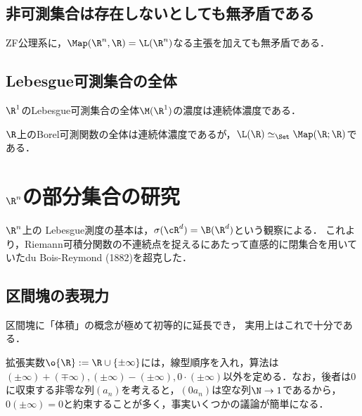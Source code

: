\documentclass[uplatex, dvipdfmx]{jsreport}
\begin{document}
\subsection{非可測集合は存在しないとしても無矛盾である}

\begin{theorem}[Solovay, R. (1970).]
    ZF公理系に，$\Map(\R^n,\R)=\L(\R^n)$なる主張を加えても無矛盾である．
\end{theorem}

\subsection{Lebesgue可測集合の全体}

\begin{corollary}
    $\R^1$のLebesgue可測集合の全体$\M(\R^1)$の濃度は連続体濃度である．
\end{corollary}

\begin{theorem}
    $\R$上のBorel可測関数の全体は連続体濃度であるが，$\L(\R)\simeq_\Set\Map(\R;\R)$である．
\end{theorem}

\section{$\R^n$の部分集合の研究}

\begin{tcolorbox}[colframe=ForestGreen, colback=ForestGreen!10!white,breakable,colbacktitle=ForestGreen!40!white,coltitle=black,fonttitle=\bfseries\sffamily,
    title=]
    $\R^n$上の
    Lebesgue測度の基本は，$\sigma(\cR^d)=\B(\R^d)$という観察による．
    これより，Riemann可積分関数の不連続点を捉えるにあたって直感的に閉集合を用いていたdu Bois-Reymond (1882)を超克した．
\end{tcolorbox}

\subsection{区間塊の表現力}

\begin{tcolorbox}[colframe=ForestGreen, colback=ForestGreen!10!white,breakable,colbacktitle=ForestGreen!40!white,coltitle=black,fonttitle=\bfseries\sffamily,
title=]
    区間塊に「体積」の概念が極めて初等的に延長でき，
    実用上はこれで十分である．
\end{tcolorbox}

\begin{definition}
    拡張実数$\o{\R}:=\R\cup\{\pm\infty\}$には，線型順序を入れ，算法は$(\pm\infty)+(\mp\infty),(\pm\infty)-(\pm\infty),0\cdot(\pm\infty)$以外を定める．なお，後者は$0$に収束する非零な列$(a_n)$を考えると，$(0a_n)$は空な列$\N\to 1$であるから，$0(\pm\infty)=0$と約束することが多く，事実いくつかの議論が簡単になる．
\end{definition}
\end{document}
